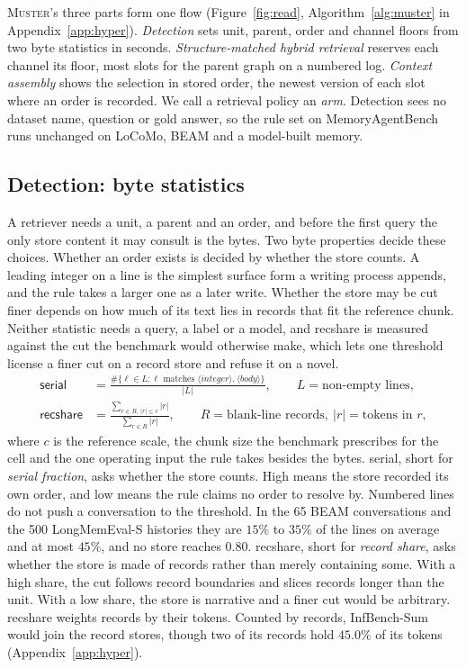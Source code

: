 \documentclass{article}
\newcommand{\sys}{\textsc{Muster}}
\newcommand{\serial}{\textsf{serial}}
\newcommand{\cov}{\textsf{recshare}}
\begin{document}
\sys{}'s three parts form one flow (Figure~\ref{fig:read}, Algorithm~\ref{alg:muster} in Appendix~\ref{app:hyper}). \emph{Detection} sets unit, parent, order and channel floors from two byte statistics in seconds. \emph{Structure-matched hybrid retrieval} reserves each channel its floor, most slots for the parent graph on a numbered log. \emph{Context assembly} shows the selection in stored order, the newest version of each slot where an order is recorded. We call a retrieval policy an \emph{arm}. Detection sees no dataset name, question or gold answer, so the rule set on MemoryAgentBench runs unchanged on LoCoMo, BEAM and a model-built memory.

\subsection{Detection: byte statistics}\label{sec:stats}

A retriever needs a unit, a parent and an order, and before the first query the only store content it may consult is the bytes. Two byte properties decide these choices. Whether an order exists is decided by whether the store counts. A leading integer on a line is the simplest surface form a writing process appends, and the rule takes a larger one as a later write. Whether the store may be cut finer depends on how much of its text lies in records that fit the reference chunk. Neither statistic needs a query, a label or a model, and \cov{} is measured against the cut the benchmark would otherwise make, which lets one threshold license a finer cut on a record store and refuse it on a novel.
\begin{align}
\serial &= \frac{\#\{\ell \in L : \ell \text{ matches } \langle\textit{integer}\rangle\texttt{.}\ \langle\textit{body}\rangle\}}{|L|},
\qquad L = \text{non-empty lines}, \\
\cov &= \frac{\sum_{r \in R,\, |r| \le c} |r|}{\sum_{r \in R} |r|},
\qquad R = \text{blank-line records},\ |r| = \text{tokens in } r,
\end{align}
where $c$ is the reference scale, the chunk size the benchmark prescribes for the cell and the one operating
input the rule takes besides the bytes.
\serial{}, short for \emph{serial fraction}, asks whether the store counts. High means the store recorded its own order, and low means the rule claims no order to resolve by. Numbered lines do not push a conversation to the threshold. In the 65 BEAM conversations and the 500 LongMemEval-S histories \cite{longmemeval} they are $15\%$ to $35\%$ of the lines on average and at most $45\%$, and no store reaches $0.80$. \cov{}, short for \emph{record share}, asks whether the store is made of
records rather than merely containing some. With a high share, the cut follows record boundaries and slices records longer than the unit.
With a low share, the store is narrative and a finer cut would be arbitrary. \cov{} weights records by their tokens. Counted by records, InfBench-Sum would join the record stores, though two of its records hold $45.0\%$ of its tokens (Appendix~\ref{app:hyper}).
\end{document}
